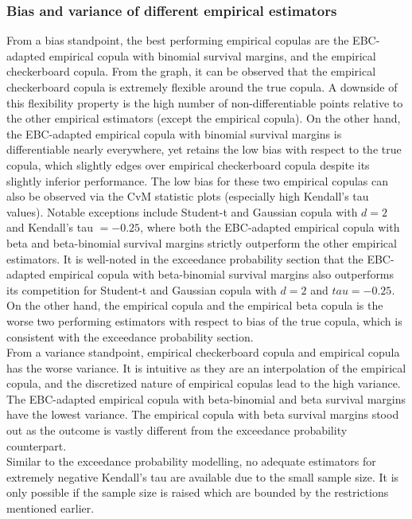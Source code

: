 \documentclass[12pt]{report}
\newcommand{\1}{\mathbf{1}}
\begin{document}
\begin{flushleft}
\subsubsection{Bias and variance of different empirical estimators}
From a bias standpoint, the best performing empirical copulas are the EBC-adapted empirical copula with binomial survival margins, and the empirical checkerboard copula. From the graph, it can be observed that the empirical checkerboard copula is extremely flexible around the true copula. A downside of this flexibility property is the high number of non-differentiable points relative to the other empirical estimators (except the empirical copula). On the other hand, the EBC-adapted empirical copula with binomial survival margins is differentiable nearly everywhere, yet retains the low bias with respect to the true copula, which slightly edges over empirical checkerboard copula despite its slightly inferior performance. The low bias for these two empirical copulas can also be observed via the CvM statistic plots (especially high Kendall's tau values). Notable exceptions include Student-t and Gaussian copula with $d = 2$ and Kendall's tau $= -0.25$, where both the EBC-adapted empirical copula with beta and beta-binomial survival margins strictly outperform the other empirical estimators. It is well-noted in the exceedance probability section that the EBC-adapted empirical copula with beta-binomial survival margins also outperforms its competition for Student-t and Gaussian copula with $d = 2$ and $tau = -0.25$. On the other hand, the empirical copula and the empirical beta copula is the worse two performing estimators with respect to bias of the true copula, which is consistent with the exceedance probability section.\\
\vspace{0.5cm}
From a variance standpoint, empirical checkerboard copula and empirical copula has the worse variance. It is intuitive as they are an interpolation of the empirical copula, and the discretized nature of empirical copulas lead to the high variance. The EBC-adapted empirical copula with beta-binomial and beta survival margins have the lowest variance. The empirical copula with beta survival margins stood out as the outcome is vastly different from the exceedance probability counterpart. \\
\vspace{0.5cm}
Similar to the exceedance probability modelling, no adequate estimators for extremely negative Kendall's tau are available due to the small sample size. It is only possible if the sample size is raised which are bounded by the restrictions mentioned earlier.


\end{flushleft}
\end{document}

